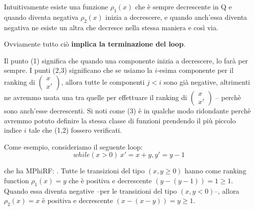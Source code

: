 Intuitivamente esiste una funzione $\rho_1(x)$ che è sempre
decrescente in  Q e quando diventa negativa $\rho_2(x)$ inizia a decrescere,
e quando anch'essa diventa negativa ne esiste un altra che decresce nella stessa
maniera e così via.

Ovviamente tutto ciò \textbf{implica la terminazione del loop}.

Il punto (1) significa che quando una componente inizia a decrescere, lo farà
per sempre.
I punti (2,3) significano che se usiamo la $i$-esima componente per il ranking
di $\begin{pmatrix}x\\x'\end{pmatrix}$, allora tutte le componenti $j<i$ sono
già negative, altrimenti ne avremmo usata una tra quelle per effettuare il ranking di $\begin{pmatrix}x\\x'\end{pmatrix}$
-- perchè sono anch'esse decrescenti.
Si noti come (3) è in qualche modo ridondante perchè avremmo potuto definire la
stessa classe di funzioni prendendo il più piccolo indice $i$ tale che (1,2)
fossero verificati.

Come esempio, consideriamo il seguente loop:
\[while ( x>0 )\: { x'=x+y, y'=y-1 }\]

che ha MPhiRF: \(<y,x>.\)
Tutte le transizioni del tipo $(x,y\geq 0)$ hanno come ranking function
$\rho_1(x)=y$ che è positiva e decrescente $(y-(y-1)) =1 \geq 1$. Quando essa
diventa negative --per le transizioni del tipo $(x,y<0)$--, allora
$\rho_2(x)=x$ è positiva e decrescente $(x - (x-y)) = y \geq 1$.
